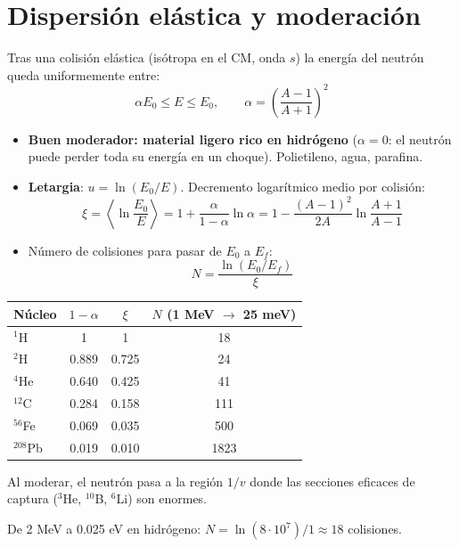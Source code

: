 \section{Dispersión elástica y moderación}
\begin{clave}[Moderación]
Tras una colisión elástica (isótropa en el CM, onda $s$) la energía del neutrón queda uniformemente entre:
\[
\alpha E_0\le E\le E_0,\qquad \alpha=\left(\frac{A-1}{A+1}\right)^2
\]
\begin{itemize}
\item \textbf{Buen moderador: material ligero rico en hidrógeno} ($\alpha=0$: el neutrón puede perder toda su energía en un choque).
Polietileno, agua, parafina.
\item \textbf{Letargia}: $u=\ln(E_0/E)$. Decremento logarítmico medio por colisión:
\[ \xi=\left\langle\ln\frac{E_0}{E}\right\rangle=1+\frac{\alpha}{1-\alpha}\ln\alpha=1-\frac{(A-1)^2}{2A}\ln\frac{A+1}{A-1} \]
\item Número de colisiones para pasar de $E_0$ a $E_f$:
\[ N=\frac{\ln(E_0/E_f)}{\xi} \]
\end{itemize}
\begin{center}\small
\begin{tabular}{lccc}
\toprule
Núcleo & $1-\alpha$ & $\xi$ & $N$ (1 MeV $\to$ 25 meV)\\
\midrule
$^1$H & 1 & 1 & 18\\ $^2$H & 0.889 & 0.725 & 24\\ $^4$He & 0.640 & 0.425 & 41\\
$^{12}$C & 0.284 & 0.158 & 111\\ $^{56}$Fe & 0.069 & 0.035 & 500\\ $^{208}$Pb & 0.019 & 0.010 & 1823\\
\bottomrule
\end{tabular}
\end{center}
Al moderar, el neutrón pasa a la región $1/v$ donde las secciones eficaces de captura ($^3$He, $^{10}$B, $^6$Li) son enormes.
\end{clave}
\begin{ejemplo}
De 2 MeV a 0.025 eV en hidrógeno: $N=\ln(8\cdot10^7)/1\approx18$ colisiones.
\end{ejemplo}

